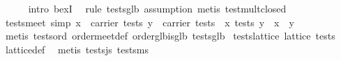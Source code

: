 \begin{isabellebody}
\ \ \ \ \isamarkupfalse%
\ {}intro\ bexI{}\ \isamarkupfalse%
\ {}rule\ tests{}glb{}\ assumption{}{}\ metis\ test{}mult{}closed{}\isanewline
{}\isamarkupfalse%
%
\endisatagproof
{\isafoldproof}%
%
\isadelimproof
\isanewline
%
\endisadelimproof
\isanewline
{}\isamarkupfalse%
\ tests{}meet\ {}simp{}{}\ {}{}x\ {}\ carrier\ tests{}\ y\ {}\ carrier\ tests{}\ {}\ x\ {}\isactrlbsub tests\isactrlesub \ y\ {}\ x\ {}\ y{}\isanewline
%
\isadelimproof
\ \ %
\endisadelimproof
%
\isatagproof
{}\isamarkupfalse%
\ {}metis\ tests{}ord\ order{}meet{}def\ order{}glb{}is{}glb\ tests{}glb{}%
\endisatagproof
{\isafoldproof}%
%
\isadelimproof
\isanewline
%
\endisadelimproof
\isanewline
{}\isamarkupfalse%
\ tests{}lattice{}\ {}lattice\ tests{}\isanewline
%
\isadelimproof
\ \ %
\endisadelimproof
%
\isatagproof
{}\isamarkupfalse%
\ lattice{}def\ \isamarkupfalse%
\ {}metis\ tests{}js\ tests{}ms{}%

\end{isabellebody}
